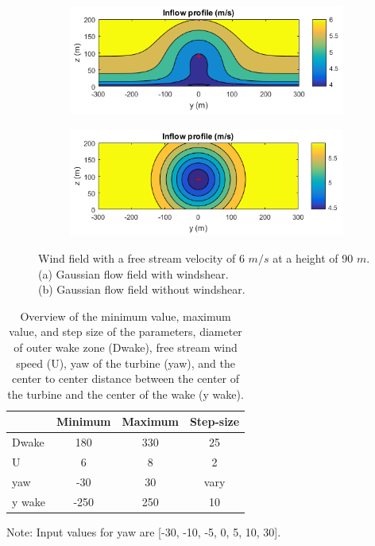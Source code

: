 \begin{figure}
\centering
   \begin{subfigure}[b]{0.50\textwidth}
\includegraphics[width=\linewidth]{./Figures/PlotWindshearU6.png} %
  \caption{}
  \label{fig:windsh}
  \end{subfigure}

\begin{subfigure}[b]{0.50\textwidth}
    \includegraphics[width=\linewidth]{./Figures/PlotWithoutWindshearU6.png} %
  \caption{}
  \label{fig:nowindsh}
\end{subfigure}

\caption[Two Gaussian flow fields]{Wind field with a free stream velocity of 6 $m/s$ at a height of 90 $m$.\\ (a) Gaussian flow field with windshear. \\(b) Gaussian flow field without windshear.}
\label{fig:windshear}
\end{figure}



\begin{table}[h]
	\caption{Overview of the minimum value, maximum value, and step size of the parameters, diameter of outer wake zone (Dwake), free stream wind speed (U), yaw of the turbine (yaw), and the center to center distance between the center of the turbine and the center of the wake (y wake).}
	\centering
	\label{tab:pars}
	\begin{tabular}{lccc}
		\hline
	 	& Minimum & Maximum & Step-size \\ 
		\hline
		Dwake & 180 & 330 & 25 \\
		U & 6 & 8 & 2 \\
		yaw & -30 & 30 & vary \\
		y wake & -250 & 250 & 10 \\
		\hline
	\end{tabular}
Note: Input values for yaw are [-30, -10, -5, 0, 5, 10, 30].
\end{table}

